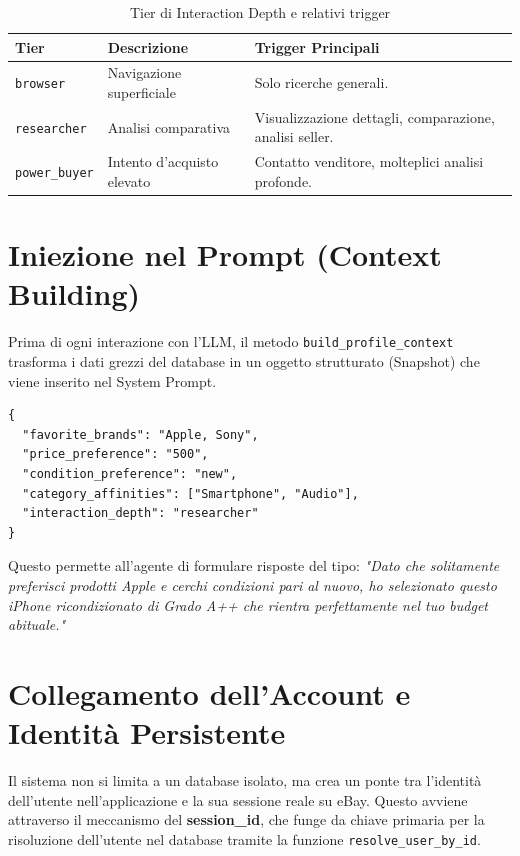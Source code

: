 \begin{table}[htbp]
\centering
\caption{Tier di Interaction Depth e relativi trigger}
\label{tab:interaction-depth}
\begin{tabular}{lll}
\hline
\textbf{Tier} & \textbf{Descrizione} & \textbf{Trigger Principali} \\
\hline
\texttt{browser} & Navigazione superficiale & Solo ricerche generali. \\
\texttt{researcher} & Analisi comparativa & Visualizzazione dettagli, comparazione, analisi seller. \\
\texttt{power\_buyer} & Intento d'acquisto elevato & Contatto venditore, molteplici analisi profonde. \\
\hline
\end{tabular}
\end{table}

\section{Iniezione nel Prompt (Context Building)}
\label{sec:profiling-context}

Prima di ogni interazione con l'LLM, il metodo \texttt{build\_profile\_context} trasforma i dati grezzi del database in un oggetto strutturato (Snapshot) che viene inserito nel System Prompt.

\begin{verbatim}
{
  "favorite_brands": "Apple, Sony",
  "price_preference": "500",
  "condition_preference": "new",
  "category_affinities": ["Smartphone", "Audio"],
  "interaction_depth": "researcher"
}
\end{verbatim}

Questo permette all'agente di formulare risposte del tipo: \textit{"Dato che solitamente preferisci prodotti Apple e cerchi condizioni pari al nuovo, ho selezionato questo iPhone ricondizionato di Grado A++ che rientra perfettamente nel tuo budget abituale."}


\section{Collegamento dell'Account e Identità Persistente}
\label{sec:profiling-account}

Il sistema non si limita a un database isolato, ma crea un ponte tra l'identità dell'utente nell'applicazione e la sua sessione reale su eBay. Questo avviene attraverso il meccanismo del \textbf{session\_id}, che funge da chiave primaria per la risoluzione dell'utente nel database tramite la funzione \texttt{resolve\_user\_by\_id}.

